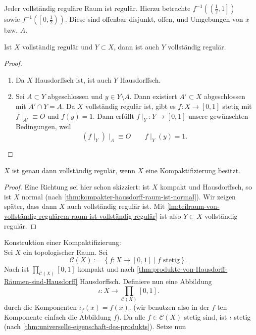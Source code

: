 \begin{remark}
    Jeder vollständig reguläre Raum ist regulär. Hierzu betrachte $f^{-1}\left( \left( \frac{1}{2},1 \right]  \right) $ sowie $f^{-1}\left( \left[ 0,\frac{1}{2}  \right)  \right) $. Diese sind offenbar disjunkt, offen, und Umgebungen von $x$ bzw.  $A$.
\end{remark}
\begin{lemma}\label{lm:teilraum-von-vollständig-regulärem-raum-ist-vollständig-regulär}
    Ist $X$ vollständig regulär und  $Y\subset X$, dann ist auch $Y$ vollständig regulär.
\end{lemma}
\begin{proof}
    \begin{enumerate}[1)]
        \item Da $X$ Hausdorffsch ist, ist auch  $Y$ Hausdorffsch.
        \item Sei  $A\subset Y$ abgeschlossen und $y\in Y \setminus A$. Dann existiert $A'\subset X$ abgeschlossen mit $A' \cap Y = A$. Da $X$ vollständig regulär ist,  gibt es  $f: X \to  [0,1]$ stetig mit $f\mid _{A'} \equiv  O$ und $f(y) = 1$. Dann erfüllt  $f\mid _Y : Y \to  [0,1]$ unsere gewünschten Bedingungen, weil
            \[
                \left(            f\mid _Y \right) \mid _A \equiv O \qquad f\mid _Y(y) = 1
            .\] 
    \end{enumerate}
\end{proof}
\begin{theorem}\label{thm:vollständig-regulär-wenn-kompaktifizierbar}
    $X$ ist genau dann vollständig regulär, wenn  $X$ eine Kompaktifizierung besitzt.
\end{theorem}
\begin{proof}
    Eine Richtung sei hier schon skizziert: ist $X$ kompakt und Hausdorffsch, so ist  $X$ normal (nach \autoref{thm:kompakter-hausdorff-raum-ist-normal}). Wir zeigen später, dass dann  $X$ auch vollständig regulär ist. Mit \autoref{lm:teilraum-von-vollständig-regulärem-raum-ist-vollständig-regulär} ist also $Y\subset X$ vollständig regulär.
\end{proof}
Konstruktion einer Kompaktifizierung: \\
Sei $X$ ein topologischer Raum. Sei 
\[
    \mathcal{C}(X) := \left \{f: X \to  [0,1] \mid  f \text{ stetig}\right\} 
.\] 
Nach  ist $\prod_{\mathcal{C}(X)}[0,1] $ kompakt und nach \autoref{thm:produkte-von-Hausdorff-Räumen-sind-Hausdorff} Hausdorffsch. Definiere nun eine Abbildung
\[
    ι : X \to  \prod_{\mathcal{C}(X)} [0,1]
.\] 
durch die Komponenten $ι_f(x) = f(x)$. (wir benutzen also in der  $f$-ten Komponente einfach die Abbildung  $f$). Da alle  $f\in \mathcal{C}(X)$ stetig sind, ist $ι$ stetig (nach \autoref{thm:universelle-eigenschaft-des-produkts}). Setze nun
